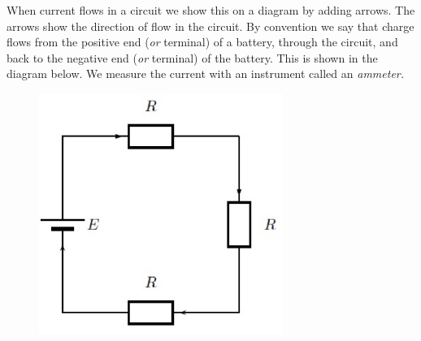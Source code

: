         \label{m38773*id66787}When current flows in a circuit we show this on a diagram by adding arrows. The arrows show the direction of flow in the circuit. By convention we say that charge flows from the positive end (\textsl{or} terminal) of a battery, through the circuit, and back to the negative end (\textsl{or} terminal) of the battery. This is shown in the diagram below. We measure the current with an instrument called an \textsl{ammeter.}\par 
        \label{m38773*id66811}
          
    \setcounter{subfigure}{0}


	\begin{figure}[H] %
    \begin{center}
    \label{m38773*id66814!!!underscore!!!media}\label{m38773*id66814!!!underscore!!!printimage}\includegraphics[width=300px]{col11305.imgs/m38773_PG10C9_026.png} %
        
      \vspace{2pt}
    \vspace{.1in}
    
    \end{center}

 \end{figure}   

    \addtocounter{footnote}{-0}
    
        \par 

